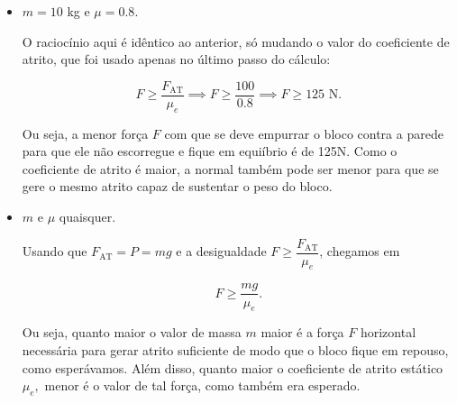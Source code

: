 \begin{exemplo}[Nível I]
\begin{itemize}
    \item [c)] $m=10$ kg e $\mu=0.8.$

     O raciocínio aqui é idêntico ao anterior, só mudando o valor do coeficiente de atrito, que foi usado apenas no último passo do cálculo:

    $$  F \geq \dfrac{F_{\text{AT}}}{\mu_e} \implies F \geq \dfrac{100}{0.8} \implies \boxed{F \geq 125 \text{ N.}} $$

    
      Ou seja, a menor força $F$ com que se deve empurrar o bloco contra a parede para que ele não escorregue e fique em equiíbrio é de 125N. Como o coeficiente de atrito é maior, a normal também pode ser menor para que se gere o mesmo atrito capaz de sustentar o peso do bloco.
    
    \item [d)] $m$ e $\mu$ quaisquer.

      Usando que $F_{\text{AT}} = P=mg$ e a desigualdade $ F \geq \dfrac{F_{\text{AT}}}{\mu_e} $, chegamos em

      $$ F \geq \dfrac{mg}{\mu_e}. $$


       Ou seja, quanto maior o valor de massa $m$ maior é a força $F$ horizontal necessária para gerar atrito suficiente de modo que o bloco fique em repouso, como esperávamos. Além disso, quanto maior o coeficiente de atrito estático $\mu_e,$ menor é o valor de tal força, como também era esperado.
    
\end{itemize}





\end{exemplo}


\vspace{0.3cm}


